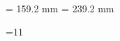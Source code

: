 
\immediate\message{\string\hsize=159.2 mm \string\vsize=239.2 mm}

\hsize= 159.2 mm
\vsize= 239.2 mm

{=11                          %

\gdef\m@g{\mag\count@
  \hsize=159.2truemm \vsize=239.2truemm \dimen\footins8truein
  \ifx\pdfpagewidth\undefined\else     %
     \pdfpagewidth=210truemm
     \pdfpageheight=297truemm
     \pdfhorigin=1truein
     \pdfvorigin=1truein
  \fi
}

}
